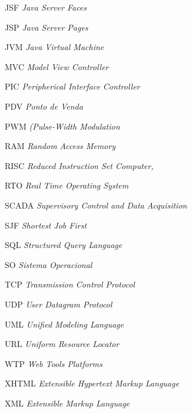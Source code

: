 \begin{siglas}
  \item[JSF] \textit{Java Server Faces}
  \item[JSP] \textit{Java Server Pages}
  \item[JVM] \textit{Java Virtual Machine}
  \item[MVC] \textit{Model View Controller}
  \item[PIC] \textit{Peripherical Interface Controller}
  \item[PDV] \textit{Ponto de Venda}
  \item[PWM] \textit{(Pulse-Width Modulation}
  \item[RAM] \textit{Random Access Memory}
  \item[RISC] \textit{Reduced Instruction Set Computer,}
  \item[RTO] \textit{Real Time Operating System}
  \item[SCADA] \textit{Supervisory Control and Data Acquisition}
  \item[SJF] \textit{Shortest Job First} 
  \item[SQL] \textit{Structured Query Language} 
  \item[SO] \textit{Sistema Operacional} 
  \item[TCP] \textit{Transmission Control Protocol}
  \item[UDP] \textit{User Datagram Protocol}
  \item[UML] \textit{Unified Modeling Language} 
  \item[URL] \textit{Uniform Resource Locator}
  \item[WTP] \textit{Web Tools Platforms}
  \item[XHTML] \textit{Extensible Hypertext Markup Language} 
  \item[XML] \textit{Extensible Markup Language} 


\end{siglas}
